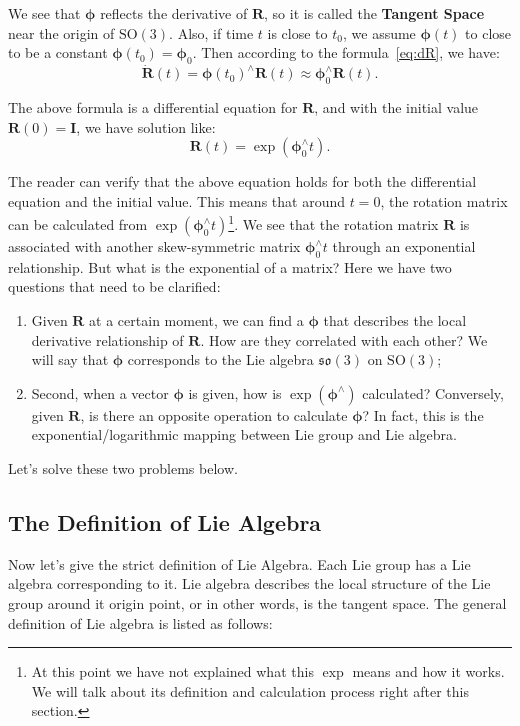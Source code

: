 We see that $\boldsymbol{\phi}$ reflects the derivative of $\mathbf{R}$, so it is called the \textbf{Tangent Space} near the origin of $\mathrm{SO}(3)$. Also, if time $t$ is close to $t_0$, we assume $\boldsymbol{\phi}(t)$ to close to be a constant $\boldsymbol{\phi}(t_0) = \boldsymbol{\phi}_0$. Then according to the formula~\eqref{eq:dR}, we have:
\[
\dot{\mathbf{R}} (t) = \boldsymbol{\phi} (t_0) ^ {\wedge} \mathbf{R}(t) \approx \boldsymbol{\phi}_0^ {\wedge} \mathbf {R}(t).
\]

The above formula is a differential equation for $\mathbf{R}$, and with the initial value $\mathbf{R}(0) = \mathbf{I}$, we have solution like:
\begin{equation}
\label{eq:so3ode}
\mathbf{R}(t) = \exp \left( \boldsymbol{\phi}_0^\wedge t \right).
\end{equation}

The reader can verify that the above equation holds for both the differential equation and the initial value. This means that around $t = 0$, the rotation matrix can be calculated from $\exp \left( \boldsymbol{\phi}_0^\wedge t \right)$\footnote{At this point we have not explained what this $\exp$ means and how it works. We will talk about its definition and calculation process right after this section. }. We see that the rotation matrix $\mathbf{R}$ is associated with another skew-symmetric matrix $\boldsymbol{\phi}_0^\wedge t$ through an exponential relationship. But what is the exponential of a matrix? Here we have two questions that need to be clarified:

\begin{enumerate}
    \item Given $\mathbf{R}$ at a certain moment, we can find a $\boldsymbol{\phi}$ that describes the local derivative relationship of $\mathbf{R}$. How are they correlated with each other? We will say that $\boldsymbol{\phi}$ corresponds to the Lie algebra $\mathfrak{so}(3)$ on $\mathrm{SO}(3)$;
    \item Second, when a vector $\boldsymbol{\phi}$ is given, how is $\exp (\boldsymbol{\phi} ^\wedge )$ calculated? Conversely, given $\mathbf{R}$, is there an opposite operation to calculate $\boldsymbol{\phi}$? In fact, this is the exponential/logarithmic mapping between Lie group and Lie algebra.
\end{enumerate}

Let's solve these two problems below.

\subsection{The Definition of Lie Algebra}
Now let's give the strict definition of Lie Algebra. Each Lie group has a Lie algebra corresponding to it. Lie algebra describes the local structure of the Lie group around it origin point, or in other words, is the tangent space. The general definition of Lie algebra is listed as follows:

